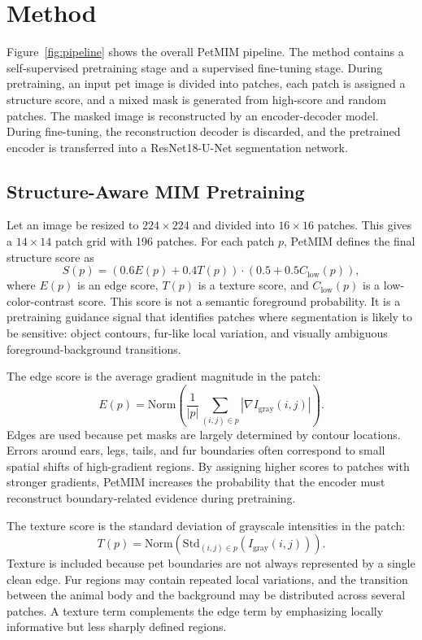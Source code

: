\documentclass[11pt]{article}
\begin{document}
\section{Method}

Figure~\ref{fig:pipeline} shows the overall PetMIM pipeline. The method contains a self-supervised pretraining stage and a supervised fine-tuning stage. During pretraining, an input pet image is divided into patches, each patch is assigned a structure score, and a mixed mask is generated from high-score and random patches. The masked image is reconstructed by an encoder-decoder model. During fine-tuning, the reconstruction decoder is discarded, and the pretrained encoder is transferred into a ResNet18-U-Net segmentation network.


\subsection{Structure-Aware MIM Pretraining}

Let an image be resized to $224 \times 224$ and divided into $16 \times 16$ patches. This gives a $14 \times 14$ patch grid with 196 patches. For each patch $p$, PetMIM defines the final structure score as
\begin{equation}
S(p) = (0.6E(p) + 0.4T(p)) \cdot (0.5 + 0.5C_{\mathrm{low}}(p)),
\label{eq:score}
\end{equation}
where $E(p)$ is an edge score, $T(p)$ is a texture score, and $C_{\mathrm{low}}(p)$ is a low-color-contrast score. This score is not a semantic foreground probability. It is a pretraining guidance signal that identifies patches where segmentation is likely to be sensitive: object contours, fur-like local variation, and visually ambiguous foreground-background transitions.

The edge score is the average gradient magnitude in the patch:
\begin{equation}
E(p)=
\mathrm{Norm}\left(
\frac{1}{|p|}
\sum_{(i,j)\in p}
|\nabla I_{\mathrm{gray}}(i,j)|
\right).
\label{eq:edge}
\end{equation}
Edges are used because pet masks are largely determined by contour locations. Errors around ears, legs, tails, and fur boundaries often correspond to small spatial shifts of high-gradient regions. By assigning higher scores to patches with stronger gradients, PetMIM increases the probability that the encoder must reconstruct boundary-related evidence during pretraining.

The texture score is the standard deviation of grayscale intensities in the patch:
\begin{equation}
T(p)=
\mathrm{Norm}\left(
\mathrm{Std}_{(i,j)\in p}(I_{\mathrm{gray}}(i,j))
\right).
\label{eq:texture}
\end{equation}
Texture is included because pet boundaries are not always represented by a single clean edge. Fur regions may contain repeated local variations, and the transition between the animal body and the background may be distributed across several patches. A texture term complements the edge term by emphasizing locally informative but less sharply defined regions.
\end{document}
